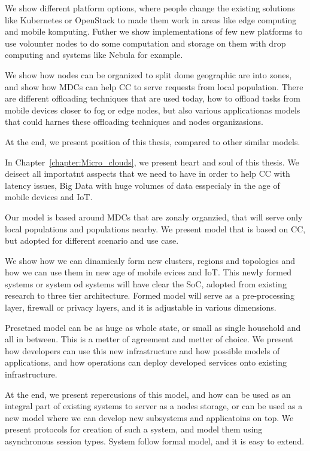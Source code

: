We show different platform options, where people change the existing solutions like Kubernetes or OpenStack to made them work in areas like edge computing and mobile komputing. Futher we show implementations of few new platforms to use volounter nodes to do some computation and storage on them with drop computing and systems like Nebula for example.

We show how nodes can be organized to split dome geographic are into zones, and show how MDCs can help CC to serve requests from local population. There are different offloading techniques that are used today, how to offload tasks from mobile devices closer to fog or edge nodes, but also various applicationas models that could harnes these offloading techniques and nodes organizasions.

At the end, we present position of this thesis, compared to other similar models.

In Chapter~\ref{chapter:Micro_clouds}, we present heart and soul of this thesis. We deisect all importatnt asspects that we need to have in order to help CC with latency issues, Big Data with huge volumes of data esspecialy in the age of mobile devices and IoT.

Our model is based around MDCs that are zonaly organzied, that will serve only local populations and populations nearby. We present model that is based on CC, but adopted for different scenario and use case.

We show how we can dinamicaly form new clusters, regions and topologies and how we can use them in new age of mobile evices and IoT. This newly formed systems or system od systems will have clear the SoC, adopted from existing research to three tier architecture. Formed model will serve as a pre-processing layer, firewall or privacy layers, and it is adjustable in various dimensions.

Presetned model can be as huge as whole state, or small as single household and all in between. This is a metter of agreement and metter of choice. We present how developers can use this new infrastructure and how possible models of applications, and how operations can deploy developed services onto existing infrastructure.

At the end, we present repercusions of this model, and how can be used as an integral part of existing systems to server as a nodes storage, or can be used as a new model where we can develop new subsystems and applicatoins on top. We present protocols for creation of such a system, and model them using asynchronous session types. System follow formal model, and it is easy to extend.

